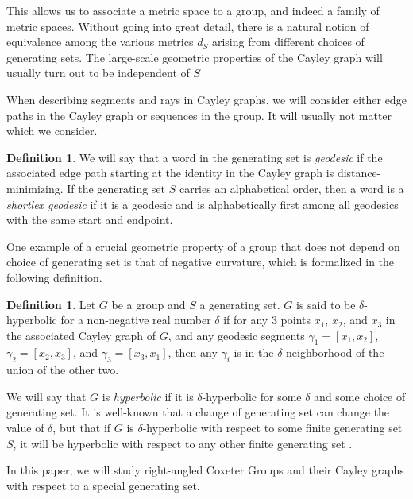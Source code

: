 \documentclass[10pt,a4paper]{amsart}
\theoremstyle{definition}
\newtheorem{definition}[theorem]{Definition}
\theoremstyle{remark}
\begin{document}
	This allows us to associate a metric space to a group, and indeed a family of metric spaces. Without going into great detail, there is a natural notion of equivalence among the various metrics $d_S$ arising from different choices of generating sets. The large-scale geometric properties of the Cayley graph will usually turn out to be independent of $S$
    
	When describing segments and rays in Cayley graphs, we will consider either edge paths in the Cayley graph or sequences in the group. It will usually not matter which we consider. 
	
	\begin{definition}
		
		We will say that a word in the generating set is \textit{geodesic} if the associated edge path starting at the identity in the Cayley graph is distance-minimizing. If the generating set $S$ carries an alphabetical order, then a word is a \textit{shortlex geodesic} if it is a geodesic and is alphabetically first among all geodesics with the same start and endpoint.
		
	\end{definition}
	
	One example of a crucial geometric property of a group that does not depend on choice of generating set is that of negative curvature, which is formalized in the following definition.	
	
	\begin{definition}
		
		Let $G$ be a group and $S$ a generating set. $G$ is said to be $\delta$-hyperbolic for a non-negative real number $\delta$ if for any 3 points $x_1$, $x_2$, and $x_3$ in the associated Cayley graph of $G$, and any geodesic segments $\gamma_1=[x_1,x_2]$, $\gamma_2=[x_2, x_3]$, and $\gamma_3=[x_3,x_1]$, then any $\gamma_i$ is in the $\delta$-neighborhood of the union of the other two.
		
	\end{definition}
	
	We will say that $G$ is \textit{hyperbolic} if it is $\delta$-hyperbolic for some $\delta$ and some choice of generating set. It is well-known that a change of generating set can change the value of $\delta$, but that if $G$ is $\delta$-hyperbolic with respect to some finite generating set $S$, it will be hyperbolic with respect to any other finite generating set \cite{BridsonHaefliger}.

	In this paper, we will study right-angled Coxeter Groups and their Cayley graphs with respect to a special generating set. 
	
\end{document}
